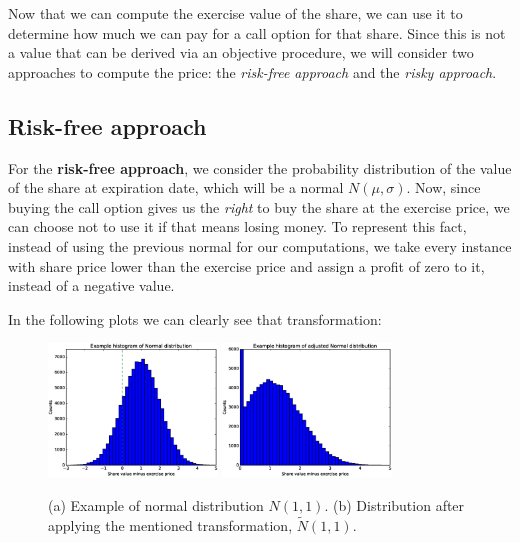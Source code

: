 \documentclass[8 pt]{article}
\begin{document}
Now that we can compute the exercise value of the share, we can use it to determine how much we can pay for a call option for that share. Since this is not a value that can be derived via an objective procedure, we will consider two approaches to compute the price: the \emph{risk-free approach} and the \emph{risky approach}.

\subsection{Risk-free approach}

For the \textbf{risk-free approach}, we consider the probability distribution of the value of the share at expiration date, which will be a normal $N(\mu, \sigma)$. Now, since buying the call option gives us the \emph{right} to buy the share at the exercise price, we can choose not to use it if that means losing money. To represent this fact, instead of using the previous normal for our computations, we take every instance with share price lower than the exercise price and assign a profit of zero to it, instead of a negative value.

In the following plots we can clearly see that transformation:

\begin{figure}[H]
  \begin{center}
    \includegraphics[width=0.4\textwidth]{graphs/ex-normal-1.eps}
    \includegraphics[width=0.4\textwidth]{graphs/ex-normal-2.eps}
    \caption{(a) Example of normal distribution $N(1,1)$. (b) Distribution after applying the mentioned transformation, $\tilde N(1,1)$.}
    \label{fig:ex_normal}
  \end{center}
\end{figure}
\end{document}
